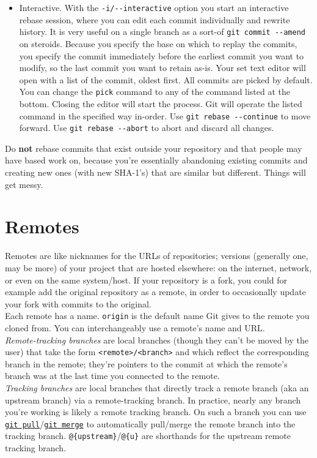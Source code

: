 \documentclass[8pt, table, xcdraw]{article}%
\begin{document}
\begin{itemize}
    \item Interactive. With the \lstinline{-i/--interactive} option you start an interactive rebase session, where you can edit each commit individually and rewrite history. It is very useful on a single branch as a sort-of \lstinline{git commit --amend} on steroids. Because you specify the base on which to replay the commits, you specify the commit immediately before the earliest commit you want to modify, so the last commit you want to retain as-is. Your set text editor will open with a list of the commit, oldest first. All commits are picked by default. You can change the \lstinline{pick} command to any of the command listed at the bottom. Closing the editor will start the process. Git will operate the listed command in the specified way in-order. Use \lstinline{git rebase --continue} to move forward. Use \lstinline{git rebase --abort} to abort and discard all changes.
\end{itemize}

Do \textbf{not} rebase commits that exist outside your repository and that people may have based work on, because you’re essentially abandoning existing commits and creating new ones (with new SHA-1’s) that are similar but different. Things will get messy.

\section{Remotes} \label{remotes}

Remotes are like nicknames for the URLs of repositories; versions (generally one, may be more) of your project that are hosted elsewhere: on the internet, network, or even on the same system/host. If your repository is a fork, you could for example add the original repository as a remote, in order to occasionally update your fork with commits to the original.\\
Each remote has a name. \lstinline{origin} is the default name Git gives to the remote you cloned from. You can interchangeably use a remote's name and URL.\\
\emph{Remote-tracking branches} are local branches (though they can't be moved by the user) that take the form \lstinline{<remote>/<branch>} and which reflect the corresponding branch in the remote; they're pointers to the commit at which the remote's branch was at the last time you connected to the remote.\\
\emph{Tracking branches} are local branches that directly track a remote branch (aka an upstream branch) via a remote-tracking branch. In practice, nearly any branch you're working is likely a remote tracking branch. On such a branch you can use \hyperref[pull]{\lstinline{git pull}}/\hyperref[merge]{\lstinline{git merge}} to automatically pull/merge the remote branch into the tracking branch. \lstinline|@{upstream}|/\lstinline|@{u}| are shorthands for the upstream remote tracking branch.
\end{document}
